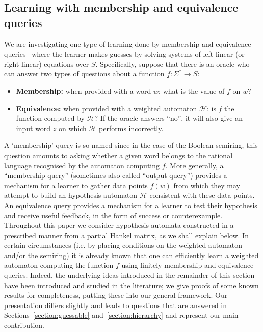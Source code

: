 \documentclass{lmcs}
\numberwithin{theorem}{section}
\begin{document}
\subsection{Learning with membership and equivalence queries}

We are investigating one type of learning done by membership and equivalence queries~\cite{A87,BV96,BM15} where the learner makes guesses by solving systems of left-linear (or right-linear) equations over $S$. Specifically, suppose that there is an oracle who can answer two types of questions about a function $f: \Sigma^* \rightarrow S$:
\begin{itemize}
	\item \textbf{Membership:} when provided with a word $w$: what is the value of $f$ on $w$? 
	\item \textbf{Equivalence:} when provided with a weighted automaton $\mathcal{H}$: is $f$ the function computed by $\mathcal{H}$? If the oracle answers ``no'', it will also give an input word $z$ on which $\mathcal{H}$ performs incorrectly.
\end{itemize}
A `membership' query is so-named since in the case of the Boolean semiring, this question amounts to asking whether a given word belongs to the rational language recognised by the automaton computing $f$. More generally, a ``membership query'' (sometimes also called ``output query'') provides a mechanism for a learner to gather data points $f(w)$ from which they may attempt to build an hypothesis automaton $\mathcal{H}$ consistent with these data points. An equivalence query provides a mechanism for a learner to test their hypothesis and receive useful feedback, in the form of success or counterexample. Throughout this paper we consider hypothesis automata constructed in a prescribed manner from a partial Hankel matrix, as we shall explain below.  In certain circumstances (i.e. by placing conditions on the weighted automaton and/or the semiring) it is already known that one can efficiently learn a weighted automaton computing the function $f$ using finitely membership and equivalence queries. Indeed, the underlying ideas introduced in the remainder of this section have been introduced and studied in the literature;  we give proofs of some known results for completeness, putting these into our general framework. Our presentation differs slightly and leads to questions that are answered in Sections~\ref{section:guessable} and~\ref{section:hierarchy} and represent our main contribution.
\end{document}
